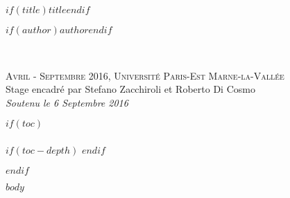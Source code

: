 \documentclass[$if(fontsize)$$fontsize$$endif$]{book} %
\begin{document}
\let\cleardoublepage\clearpage


\begingroup
\thispagestyle{empty}
\centering
\vspace*{5cm}
\par\normalfont\fontsize{35}{35}\sffamily\selectfont
\textbf{$if(title)$$title$$endif$}\\
{\LARGE }\par %
\vspace*{1cm}
{\Huge $if(author)$$author$$endif$}\par %
\endgroup


\newpage
~\vfill
\thispagestyle{empty}

\noindent \textsc{Avril - Septembre 2016, Université Paris-Est Marne-la-Vallée}\\

\noindent Stage encadré par Stefano Zacchiroli et Roberto Di Cosmo\\ %

\noindent \textit{Soutenu le 6 Septembre 2016} %


$if(toc)$

\pagestyle{empty} %

\clearpage{}
\paragraph{}
\newpage{}



\renewcommand\contentsname{Table des Matières}
\renewcommand{\bibname}{Bibliographie}
$if(toc-depth)$
\setcounter{tocdepth}{$toc-depth$}
$endif$
\tableofcontents%


\pagestyle{fancy} %
$endif$


$body$
\end{document}
